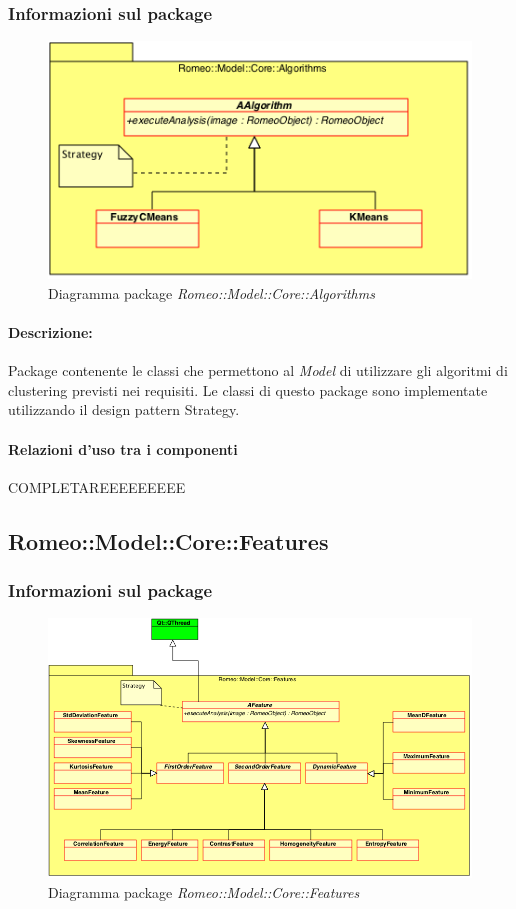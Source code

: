 		\subsubsection{Informazioni sul package}
			\begin{figure}[!h]
				\centering
				\includegraphics[scale=0.5]{./Content/Immagini/Romeo__Model__Core__Adapters__Algorithms.png}
				\caption{Diagramma package \textsl{Romeo::Model::Core::Algorithms}}
			\end{figure}
			\paragraph{Descrizione:}Package\g{} contenente le classi che permettono al \textsl{Model} di utilizzare gli algoritmi di clustering\g{} previsti nei requisiti. Le classi di questo package\g{} sono implementate utilizzando il design pattern\g{} Strategy.
			\paragraph{Relazioni d'uso tra i componenti}
COMPLETAREEEEEEEEE	\subsection{Romeo::Model::Core::Features}
		\subsubsection{Informazioni sul package}
			\begin{figure}[!h]
				\centering
				\includegraphics[scale=0.5]{./Content/Immagini/Romeo__Model__Core__Adapters__Features.png}
				\caption{Diagramma package \textsl{Romeo::Model::Core::Features}}
			\end{figure}
